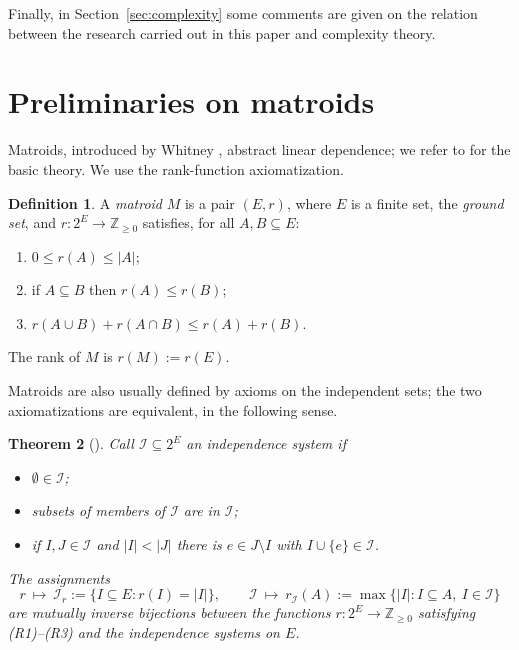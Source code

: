 \documentclass[11pt,a4paper]{article}
\newtheorem{theorem}{Theorem}[section]
\theoremstyle{definition}
\newtheorem{definition}[theorem]{Definition}
\begin{document}
Finally, in Section~\ref{sec:complexity} some comments are given on the
relation between the research carried out in this paper and complexity
theory.


\section{Preliminaries on matroids}\label{sec:prelim}

Matroids, introduced by Whitney \cite{whitney35}, abstract linear dependence; we refer to \cite{welsh,oxley} for the basic theory. We use the rank-function axiomatization.

\begin{definition}\label{def:matroid-rank}
A \emph{matroid} $M$ is a pair $(E,r)$, where $E$ is a finite set, the \emph{ground set}, and $r:2^E\to\mathbb Z_{\ge0}$ satisfies, for all $A,B\subseteq E$:
\begin{enumerate}[label=\textnormal{(R\arabic*)}]
    \item $0\le r(A)\le|A|$;
    \item if $A\subseteq B$ then $r(A)\le r(B)$;
    \item $r(A\cup B)+r(A\cap B)\le r(A)+r(B)$.
\end{enumerate}
The rank of $M$ is $r(M):=r(E)$.
\end{definition}

Matroids are also usually defined by axioms on the independent sets; the two
axiomatizations are equivalent, in the following sense.

\begin{theorem}[\cite{whitney35,welsh}]\label{thm:rank-equivalence}
Call $\mathcal I\subseteq2^E$ an \emph{independence system} if
\begin{itemize}
    \item $\emptyset\in\mathcal I$; \item subsets of members of $\mathcal I$ are in $\mathcal I$; \item if $I,J\in\mathcal I$ and $|I|<|J|$ there is $e\in J\setminus I$ with $I\cup\{e\}\in\mathcal I$.
\end{itemize}
The assignments
\[
r\ \longmapsto\ \mathcal I_r:=\{I\subseteq E: r(I)=|I|\},
\qquad
\mathcal I\ \longmapsto\ r_{\mathcal I}(A):=\max\{|I| : I\subseteq A,\ I\in\mathcal I\}
\]
are mutually inverse bijections between the functions $r:2^E\to\mathbb Z_{\ge0}$
satisfying \textnormal{(R1)}--\textnormal{(R3)} and the independence systems on $E$.
\end{theorem}
\end{document}
